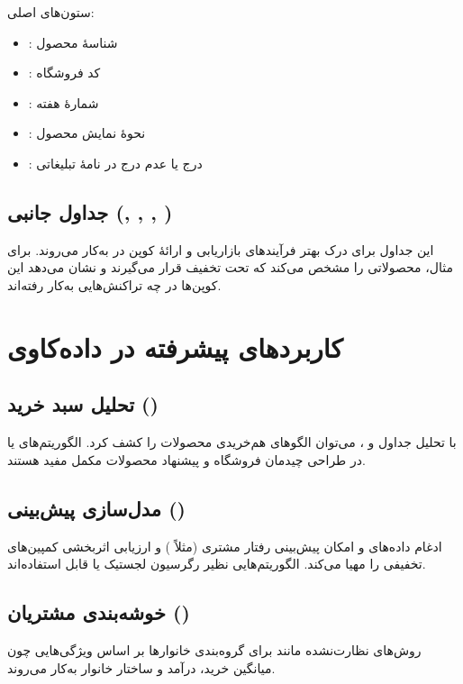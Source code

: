\documentclass[12pt]{article}
\begin{document}
\noindent ستون‌های اصلی:
\begin{itemize}
  \item {}: شناسهٔ محصول
  \item {}: کد فروشگاه
  \item {}: شمارهٔ هفته
  \item {}: نحوهٔ نمایش محصول
  \item {}: درج یا عدم درج در نامهٔ تبلیغاتی
\end{itemize}

\subsection{\textbf{جداول جانبی (, , , )}}
\noindent این جداول برای درک بهتر فرآیندهای بازاریابی و ارائهٔ کوپن در  به‌کار می‌روند. برای مثال،  محصولاتی را مشخص می‌کند که تحت تخفیف قرار می‌گیرند و  نشان می‌دهد این کوپن‌ها در چه تراکنش‌هایی به‌کار رفته‌اند.

\section{\textbf{کاربردهای پیشرفته در داده‌کاوی}}
\subsection{\textbf{تحلیل سبد خرید ()}}
\noindent با تحلیل جداول  و ، می‌توان الگوهای هم‌خریدی محصولات را کشف کرد. الگوریتم‌های  یا  در طراحی چیدمان فروشگاه و پیشنهاد محصولات مکمل مفید هستند.

\subsection{\textbf{مدل‌سازی پیش‌بینی ()}}
\noindent ادغام داده‌های  و  امکان پیش‌بینی رفتار مشتری (مثلاً ) و ارزیابی اثربخشی کمپین‌های تخفیفی را مهیا می‌کند. الگوریتم‌هایی نظیر رگرسیون لجستیک یا  قابل استفاده‌اند.

\subsection{\textbf{خوشه‌بندی مشتریان ()}}
\noindent روش‌های نظارت‌نشده مانند  برای گروه‌بندی خانوارها بر اساس ویژگی‌هایی چون میانگین خرید، درآمد و ساختار خانوار به‌کار می‌روند.
\end{document}
